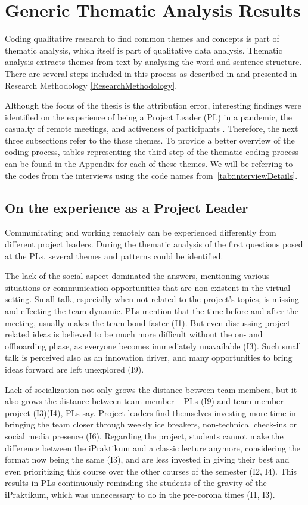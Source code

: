 \section{Generic Thematic Analysis Results}\label{Generic}

Coding qualitative research to find common themes and concepts is part of thematic analysis, which itself is part of qualitative data analysis. Thematic analysis extracts themes from text by analysing the word and sentence structure. There are several steps included in this process as described in \cite{Auerbach2003} and presented in Research Methodology \ref{ResearchMethodology}.

Although the focus of the thesis is the attribution error, interesting findings were identified on the experience of being a Project Leader (PL) in a pandemic, the casualty of remote meetings, and activeness of participants . Therefore, the next three subsections refer to the these themes. To provide a better overview of the coding process, tables representing the third step of the thematic coding process can be found in the Appendix for each of these themes. We will be referring to the codes from the interviews using the code names from~\autoref{tab:interviewDetails}.

\subsection{On the experience as a Project Leader}

Communicating and working remotely can be experienced differently from different project leaders. During the thematic analysis of the first questions posed at the PLs, several themes and patterns could be identified.

The lack of the social aspect dominated the answers, mentioning various situations or communication opportunities that are non-existent in the virtual setting. Small talk, especially when not related to the project’s topics, is missing and effecting the team dynamic. PLs mention that the time before and after the meeting, usually makes the team bond faster (I1). But even discussing project-related ideas is believed to be much more difficult without the on- and offboarding phase, as everyone becomes immediately unavailable (I3). Such small talk is perceived also as an innovation driver, and many opportunities to bring ideas forward are left unexplored (I9). 

Lack of socialization not only grows the distance between team members, but it also grows the distance between team member – PLs (I9) and team member – project (I3)(I4), PLs say. Project leaders find themselves investing more time in bringing the team closer through weekly ice breakers, non-technical check-ins or social media presence (I6). Regarding the project, students cannot make the difference between the iPraktikum and a classic lecture anymore, considering the format now being the same (I3), and are less invested in giving their best and even prioritizing this course over the other courses of the semester (I2, I4). This results in PLs continuously reminding the students of the gravity of the iPraktikum, which was unnecessary to do in the pre-corona times (I1, I3).


